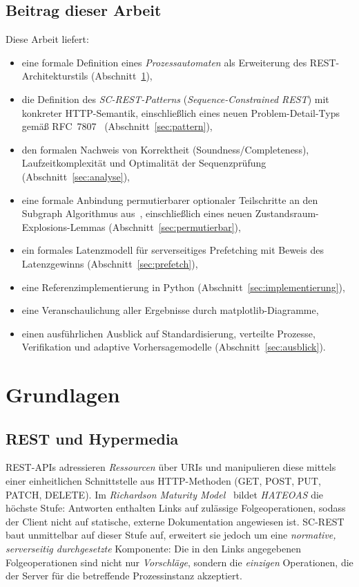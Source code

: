 ﻿\documentclass[a4paper,12pt]{article}
\theoremstyle{definition}
\begin{document}
\subsection{Beitrag dieser Arbeit}

Diese Arbeit liefert:
\begin{itemize}
	\item eine formale Definition eines \emph{Prozessautomaten} als Erweiterung des
	      REST-Architekturstils (Abschnitt~\ref{sec:grundlagen}),
	\item die Definition des \emph{SC-REST-Patterns} (\emph{Sequence-Constrained REST})
	      mit konkreter HTTP-Semantik, einschließlich eines neuen Problem-Detail-Typs
	      gemäß RFC~7807~\cite{rfc7807} (Abschnitt~\ref{sec:pattern}),
	\item den formalen Nachweis von Korrektheit (Soundness/Completeness),
	      Laufzeitkomplexität und Optimalität der Sequenzprüfung
	      (Abschnitt~\ref{sec:analyse}),
	\item eine formale Anbindung permutierbarer optionaler Teilschritte an den Subgraph
	      Algorithmus aus~\cite{epp2026subgraph}, einschließlich eines neuen
	      Zustandsraum-Explosions-Lemmas (Abschnitt~\ref{sec:permutierbar}),
	\item ein formales Latenzmodell für serverseitiges Prefetching mit Beweis des
	      Latenzgewinns (Abschnitt~\ref{sec:prefetch}),
	\item eine Referenzimplementierung in Python (Abschnitt~\ref{sec:implementierung}),
	\item eine Veranschaulichung aller Ergebnisse durch matplotlib-Diagramme,
	\item einen ausführlichen Ausblick auf Standardisierung, verteilte Prozesse,
	      Verifikation und adaptive Vorhersagemodelle (Abschnitt~\ref{sec:ausblick}).
\end{itemize}

\section{Grundlagen}
\label{sec:grundlagen}

\subsection{REST und Hypermedia}

REST-APIs adressieren \emph{Ressourcen} über URIs und manipulieren diese mittels einer
einheitlichen Schnittstelle aus HTTP-Methoden (GET, POST, PUT, PATCH, DELETE). Im
\emph{Richardson Maturity Model}~\cite{fowler2010} bildet \emph{HATEOAS} die höchste Stufe:
Antworten enthalten Links auf zulässige Folgeoperationen, sodass der Client nicht auf
statische, externe Dokumentation angewiesen ist. SC-REST baut unmittelbar auf dieser Stufe
auf, erweitert sie jedoch um eine \emph{normative, serverseitig durchgesetzte} Komponente:
Die in den Links angegebenen Folgeoperationen sind nicht nur \emph{Vorschläge}, sondern die
\emph{einzigen} Operationen, die der Server für die betreffende Prozessinstanz akzeptiert.
\end{document}
